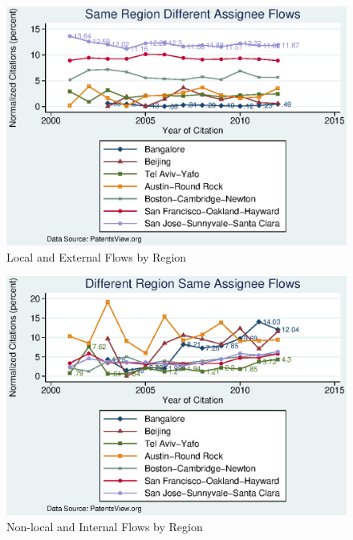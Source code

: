\documentclass[12pt]{article}
\begin{document}
\begin{figure}[h]
\begin{centering}
  \includegraphics[width=\textwidth]{SameRegionDiffAssigneeFlows}
  \caption{Local and External Flows by Region}
  \label{fig:SameRegionDiffAssigneeFlows}
\end{centering}
\end{figure}


\begin{figure}[h]
\begin{centering}
  \includegraphics[width=\textwidth]{DiffRegionSameAssigneeFlows}
  \caption{Non-local and Internal Flows by Region}
  \label{fig:DiffRegionSameAssigneeFlows}
\end{centering}
\end{figure}
\end{document}

